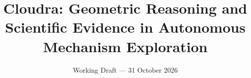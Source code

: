 \documentclass[10pt,twocolumn,a4paper]{article}
\title{Cloudra: Geometric Reasoning and Scientific Evidence in Autonomous Mechanism Exploration}
\author{}
\date{\small Working Draft --- 31 October 2026}
\makeatletter
\numberwithin{equation}{section}
\renewcommand{\maketitle}{%
  \twocolumn[{\centering
    {\LARGE\bfseries\@title\par}\vspace{0.6em}
    {\small\@date\par}\vspace{1.2em}}]%
}
\makeatother
\begin{document}
\maketitle
\nocite{ref01,ref02,ref03,ref04,ref05,ref06,ref07,ref08,ref09,ref10,ref11,ref12,ref13,ref14,ref15,ref16,ref17,ref18}

\FloatBarrier

\FloatBarrier



\end{document}
